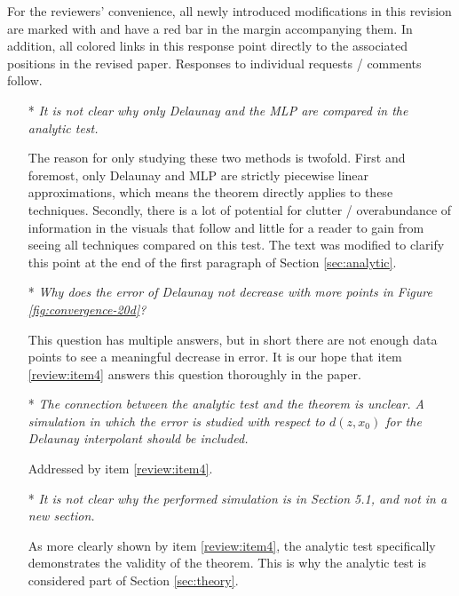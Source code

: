 \noindent For the reviewers' convenience, all newly introduced modifications in this revision are marked with  and have a red bar in the margin accompanying them. In addition, all colored links in this response point directly to the associated positions in the revised paper. Responses to individual requests / comments follow.
\vspace{.25cm}

\begin{itemize}[leftmargin=.5cm]
  \setlength{\itemsep}{.4cm}

\item[*] {\it It is not clear why only Delaunay and the MLP are compared in the analytic test.} \vspace{.2cm}

The reason for only studying these two methods is twofold. First and foremost, only Delaunay and MLP are strictly piecewise linear approximations, which means the theorem directly applies to these techniques. Secondly, there is a lot of potential for clutter / overabundance of information in the visuals that follow and little for a reader to gain from seeing all techniques compared on this test. The text was modified to clarify this point at the end of the first paragraph of Section \ref{sec:analytic}.

\newpage\setcounter{page}{0}\thispagestyle{empty}
\item[*] {\it Why does the error of Delaunay not decrease with more points in Figure \ref{fig:convergence-20d}?}\vspace{.2cm}

This question has multiple answers, but in short there are not enough data points to see a meaningful decrease in error. It is our hope that item \ref{review:item4} answers this question thoroughly in the paper.

\item[*] {\it The connection between the analytic test and the theorem is unclear. A simulation in which the error is studied with respect to $d(z,x_0)$ for the Delaunay interpolant should be included.}\vspace{.2cm}

Addressed by item \ref{review:item4}.

\item[*] {\it It is not clear why the performed simulation is in Section 5.1, and not in a new section.}\vspace{.2cm}

As more clearly shown by item \ref{review:item4}, the analytic test specifically demonstrates the validity of the theorem. This is why the analytic test is considered part of Section \ref{sec:theory}.


\end{itemize}
